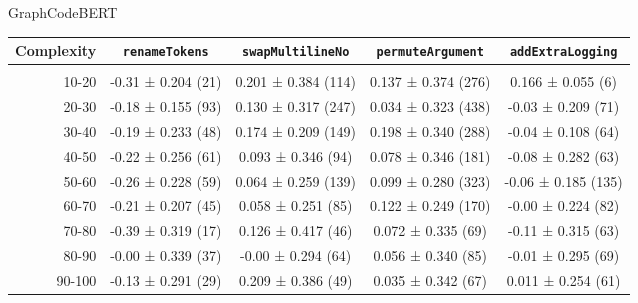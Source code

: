 \documentclass{article} %
\begin{document}
{  GraphCodeBERT
  \begin{table}[H]
    \tiny
    \begin{tabular}{r|cccc}
      Complexity          & \lstinline|renameTokens|        & \lstinline|swapMultilineNo|     & \lstinline|permuteArgument|     & \lstinline|addExtraLogging|     \\\hline\\
      10-20               & -0.31 ± 0.204 (21)  & 0.201 ± 0.384 (114) & 0.137 ± 0.374 (276) & 0.166 ± 0.055 (6)   \\
      20-30               & -0.18 ± 0.155 (93)  & 0.130 ± 0.317 (247) & 0.034 ± 0.323 (438) & -0.03 ± 0.209 (71)  \\
      30-40               & -0.19 ± 0.233 (48)  & 0.174 ± 0.209 (149) & 0.198 ± 0.340 (288) & -0.04 ± 0.108 (64)  \\
      40-50               & -0.22 ± 0.256 (61)  & 0.093 ± 0.346 (94)  & 0.078 ± 0.346 (181) & -0.08 ± 0.282 (63)  \\
      50-60               & -0.26 ± 0.228 (59)  & 0.064 ± 0.259 (139) & 0.099 ± 0.280 (323) & -0.06 ± 0.185 (135) \\
      60-70               & -0.21 ± 0.207 (45)  & 0.058 ± 0.251 (85)  & 0.122 ± 0.249 (170) & -0.00 ± 0.224 (82)  \\
      70-80               & -0.39 ± 0.319 (17)  & 0.126 ± 0.417 (46)  & 0.072 ± 0.335 (69)  & -0.11 ± 0.315 (63)  \\
      80-90               & -0.00 ± 0.339 (37)  & -0.00 ± 0.294 (64)  & 0.056 ± 0.340 (85)  & -0.01 ± 0.295 (69)  \\
      90-100              & -0.13 ± 0.291 (29)  & 0.209 ± 0.386 (49)  & 0.035 ± 0.342 (67)  & 0.011 ± 0.254 (61)  \\
    \end{tabular}
  \end{table}

}
\end{document}
